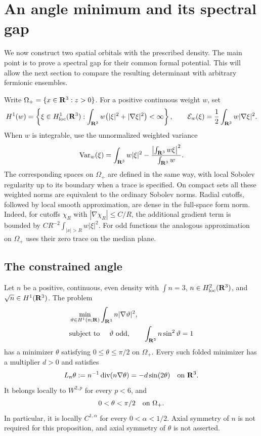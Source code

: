 \section{An angle minimum and its spectral gap}\label{sec:angle}

We now construct two spatial orbitals with the prescribed density.
The main point is to prove a spectral gap for their common formal
potential.  This will allow the next section to compare the resulting
determinant with arbitrary fermionic ensembles.

Write \(\Omega_+=\{x\in\mathbf R^3:z>0\}\).  For a positive continuous weight \(w\),
set
\[
 H^1(w)=
 \left\{\xi\in H^1_{\mathrm{loc}}(\mathbf R^3):
       \int_{\mathbf R^3}w\bigl(|\xi|^2+|\nabla\xi|^2\bigr)<\infty\right\},
 \qquad
 \mathcal E_w(\xi)=\frac12\int_{\mathbf R^3}w|\nabla\xi|^2.
\]
When \(w\) is integrable, use the unnormalized weighted variance
\[
 \operatorname{Var}_w(\xi)=
 \int_{\mathbf R^3}w|\xi|^2
 -\frac{\left|\int_{\mathbf R^3}w\xi\right|^2}{\int_{\mathbf R^3}w}.
\]
The corresponding spaces on \(\Omega_+\) are defined in the same way,
with local Sobolev regularity up to its boundary when a trace is specified.
On compact sets all these weighted norms are equivalent to the ordinary
Sobolev norms.  Radial cutoffs, followed by local smooth approximation,
are dense in the full-space form norm.  Indeed, for cutoffs \(\chi_R\)
with \(|\nabla\chi_R|\le C/R\), the additional gradient term is bounded by
\(C R^{-2}\int_{|x|>R}w|\xi|^2\).  For odd functions the analogous
approximation on \(\Omega_+\) uses their zero trace on the median plane.

\subsection{The constrained angle}

\begin{proposition}
\label{prop:angle-minimizer}
Let \(n\) be a positive, continuous, even density with
\(\int n=3\), \(n\in H^2_{\mathrm{loc}}(\mathbf R^3)\), and
\(\sqrt n\in H^1(\mathbf R^3)\).  The problem
\begin{equation}\label{eq:angle-minimum}
 \begin{aligned}
 &\min_{\vartheta\in H^1(n;\mathbf R)}
       \int_{\mathbf R^3}n|\nabla\vartheta|^2,\\
 &\text{subject to }\quad
       \vartheta\text{ odd},\qquad
       \int_{\mathbf R^3}n\sin^2\vartheta=1
 \end{aligned}
\end{equation}
has a minimizer \(\theta\) satisfying
\(0\le\theta\le\pi/2\) on \(\Omega_+\).
Every such folded minimizer has a multiplier \(d>0\) and satisfies
\begin{equation}\label{eq:angle-euler}
 L_n\theta:=n^{-1}\operatorname{div}(n\nabla\theta)
       =-d\sin(2\theta)
 \quad\hbox{on }\mathbf R^3.
\end{equation}
It belongs locally to \(W^{2,p}\) for every \(p<6\), and
\[
 0<\theta<\pi/2\quad\hbox{on }\Omega_+.
\]
In particular, it is locally \(C^{1,\alpha}\) for every
\(0<\alpha<1/2\).  Axial symmetry of \(n\) is not required for this
proposition, and axial symmetry of \(\theta\) is not asserted.
\end{proposition}

